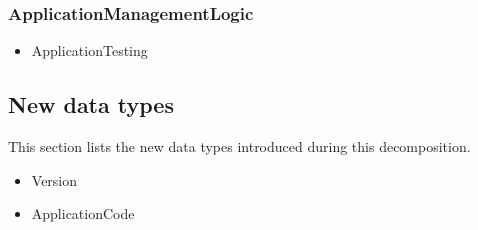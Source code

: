     \subsubsection{ApplicationManagementLogic}
        \begin{itemize}
            \item ApplicationTesting
        \end{itemize}

\subsection*{New data types}
    This section lists the new data types introduced during this decomposition.

    \begin{itemize}
        \item Version
        \item ApplicationCode
    \end{itemize}
